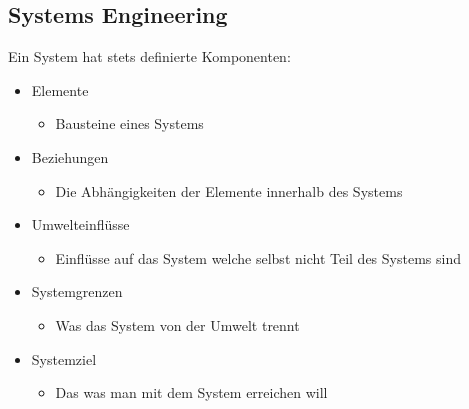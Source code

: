 \documentclass{article}
\begin{document}
	\subsection{Systems Engineering}
	Ein System hat stets definierte Komponenten:
	\begin{itemize}
		\item{Elemente}
		\begin{itemize}
			\item{Bausteine eines Systems}
		\end{itemize}
		\item{Beziehungen}
		\begin{itemize}
			\item{Die Abhängigkeiten der Elemente innerhalb des Systems}
		\end{itemize}
		\item{Umwelteinflüsse}
		\begin{itemize}
			\item{Einflüsse auf das System welche selbst nicht Teil des Systems sind}
		\end{itemize}
		\item{Systemgrenzen}
		\begin{itemize}
			\item{Was das System von der Umwelt trennt}
		\end{itemize}
		\item{Systemziel}
		\begin{itemize}
			\item{Das was man mit dem System erreichen will}
		\end{itemize}
	\end{itemize}
\end{document}
